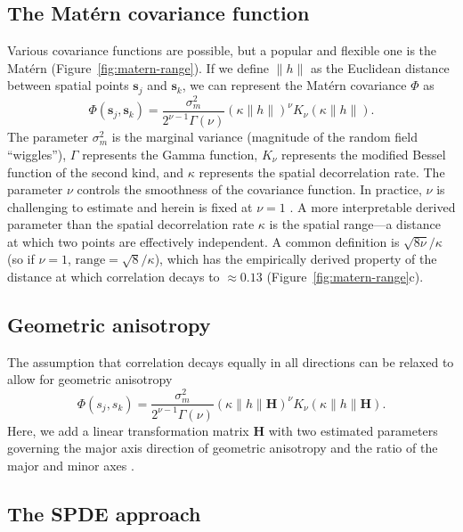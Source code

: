 \documentclass[article]{jss}\usepackage[]{graphicx}\usepackage[dvipsnames]{xcolor}
\begin{document}
\subsection{The Mat\'ern covariance function}

Various covariance functions are possible, but a popular and flexible one is the Mat\'ern \citep{whittle1954, matern1986} (Figure~\ref{fig:matern-range}).
If we define $\lVert h \rVert$ as the Euclidean distance between spatial points $\bm{s}_j$ and $\bm{s}_k$, we can represent the Mat\'ern covariance $\Phi$ as
\[
\Phi\left( \bm{s}_j, \bm{s}_k \right) =
  \frac{\sigma_m^2}{2^{\nu - 1}\Gamma(\nu)}
  \left(\kappa \lVert h \rVert \right)^\nu K_\nu
  \left( \kappa \lVert h \rVert \right).
\]
The parameter $\sigma_m^2$ is the marginal variance (magnitude of the random field ``wiggles''), $\Gamma$ represents the Gamma function, $K_\nu$ represents the modified Bessel function of the second kind, and $\kappa$ represents the spatial decorrelation rate.
The parameter $\nu$ controls the smoothness of the covariance function.
In practice, $\nu$ is challenging to estimate and herein is fixed at $\nu = 1$ \citep{lindgren2011}.
A more interpretable derived parameter than the spatial decorrelation rate $\kappa$ is the spatial range---a distance at which two points are effectively independent.
A common definition is $\sqrt{8 \nu} / \kappa$ (so if $\nu = 1$, $\mathrm{range} = \sqrt{8} / \kappa$), which has the empirically derived property of the distance at which correlation decays to $\approx 0.13$ \citep{lindgren2011} (Figure~\ref{fig:matern-range}c).

\subsection{Geometric anisotropy}

The assumption that correlation decays equally in all directions can be relaxed to allow for geometric anisotropy
\[
\Phi\left( s_j, s_k \right) =
  \frac{\sigma_m^2}{2^{\nu - 1}\Gamma(\nu)}
  \left(\kappa \lVert h \rVert \bm{H} \right)^\nu K_\nu
  \left( \kappa \lVert h \rVert \bm{H} \right).
\]
Here, we add a linear transformation matrix $\bm{H}$ with two estimated parameters governing the major axis direction of geometric anisotropy and the ratio of the major and minor axes \citep{haskard2007, lindgren2011, thorson2015ices}.

\subsection{The SPDE approach}
\end{document}
